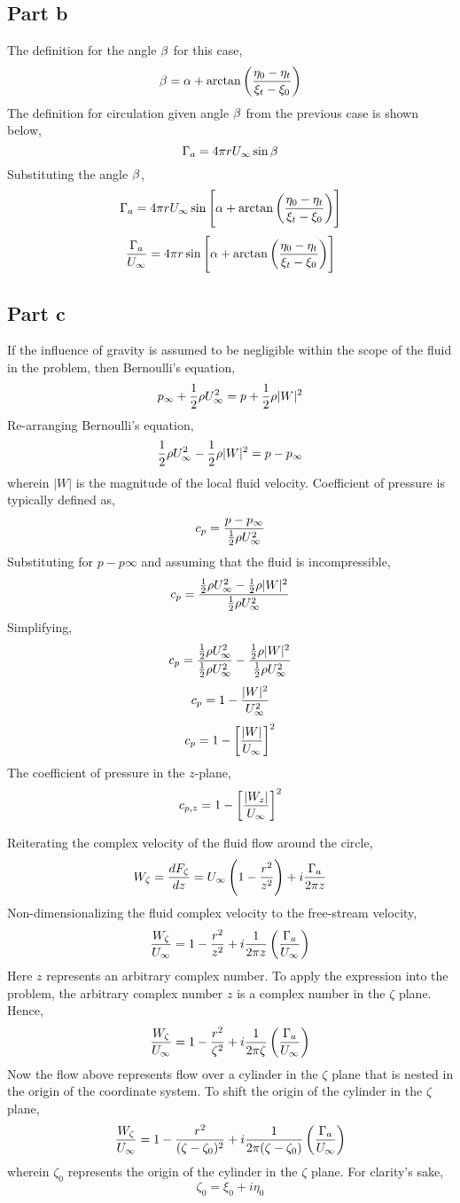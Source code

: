 \documentclass[class=report, 12pt, crop=false]{standalone}
\begin{document}
\begin{center}
\subsection{Part b}
The definition for the angle $\beta$ for this case,
$$\beta = \alpha + \arctan\left(\frac{\eta_0-\eta_t}{\xi_t-\xi_0}\right)$$
The definition for circulation given angle $\beta$ from the previous case is shown below,
$$\Gamma_a = 4\pi r U_\infty\sin\beta$$
Substituting the angle $\beta$,
$$\Gamma_a = 4\pi r U_\infty\sin\left[\alpha + \arctan\left(\frac{\eta_0-\eta_t}{\xi_t-\xi_0}\right)\right]$$
$$\frac{\Gamma_a}{U_\infty} = 4\pi r \sin\left[\alpha + \arctan\left(\frac{\eta_0-\eta_t}{\xi_t-\xi_0}\right)\right]$$
\subsection{Part c}
If the influence of gravity is assumed to be negligible within the scope of the fluid in the problem, then Bernoulli's equation,
$$p_\infty + \frac{1}{2}\rho U_{\infty}^2 = p + \frac{1}{2}\rho |W|^2$$
Re-arranging Bernoulli's equation,
$$\frac{1}{2}\rho U_{\infty}^2 - \frac{1}{2}\rho |W|^2 = p - p_\infty$$
wherein $|W|$ is the magnitude of the local fluid velocity. Coefficient of pressure is typically defined as,
$$c_p = \frac{p-p_{\infty}}{\frac{1}{2}\rho U_{\infty}^2}$$
Substituting for $p-p\infty$ and assuming that the fluid is incompressible,
$$c_p = \frac{\frac{1}{2}\rho U_{\infty}^2 - \frac{1}{2}\rho |W|^2}{\frac{1}{2}\rho U_{\infty}^2}$$
Simplifying,
$$c_p = \frac{\frac{1}{2}\rho U_{\infty}^2}{\frac{1}{2}\rho U_{\infty}^2} - \frac{\frac{1}{2}\rho |W|^2}{\frac{1}{2}\rho U_{\infty}^2}$$    
$$c_p = 1 - \frac{|W|^2}{U_{\infty}^2}$$
$$c_p = 1 - \left[\frac{|W|}{U_{\infty}}\right]^2$$
The coefficient of pressure in the $z$-plane,
$$c_{p,z} = 1 - \left[\frac{|W_z|}{U_{\infty}}\right]^2$$


Reiterating the complex velocity of the fluid flow around the circle,
$$W_{\zeta} = \frac{dF_{\zeta}}{dz} = U_\infty\left(1-\frac{r^2}{z^2}\right) + i\frac{\Gamma_a}{2\pi z}$$
Non-dimensionalizing the fluid complex velocity to the free-stream velocity,
$$\frac{W_{\zeta}}{U_\infty} = 1-\frac{r^2}{z^2} + i\frac{1}{2\pi z}\left(\frac{\Gamma_a}{U_\infty}\right)$$
Here $z$ represents an arbitrary complex number. To apply the expression into the problem, the arbitrary complex number $z$ is a complex number in the $\zeta$ plane. Hence,
$$\frac{W_{\zeta}}{U_\infty} = 1-\frac{r^2}{\zeta^2} + i\frac{1}{2\pi \zeta}\left(\frac{\Gamma_a}{U_\infty}\right)$$
Now the flow above represents flow over a cylinder in the $\zeta$ plane that is nested in the origin of the coordinate system. To shift the origin of the cylinder in the $\zeta$ plane,
$$\frac{W_{\zeta}}{U_\infty} = 1-\frac{r^2}{(\zeta-\zeta_0)^2} + i\frac{1}{2\pi (\zeta-\zeta_0)}\left(\frac{\Gamma_a}{U_\infty}\right)$$
wherein $\zeta_0$ represents the origin of the cylinder in the $\zeta$ plane. For clarity's sake,
$$\zeta_0 = \xi_0 + i\eta_0$$


\end{center}
\end{document}
